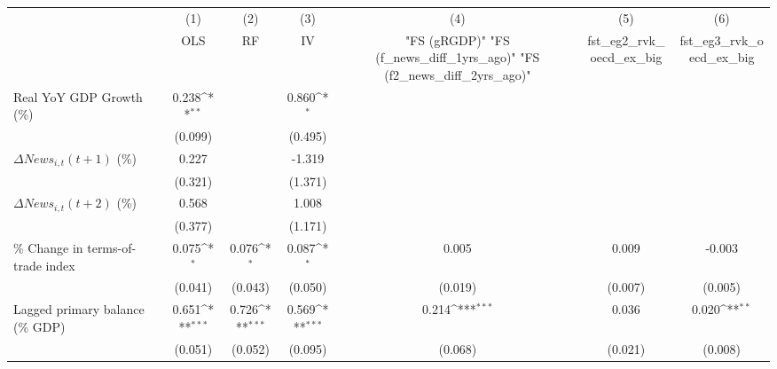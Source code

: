 {
\def\sym#1{\ifmmode^{#1}\else\(^{#1}\)\fi}
\begin{tabular}{l*{6}{c}}
\toprule
                    &\multicolumn{1}{c}{(1)}&\multicolumn{1}{c}{(2)}&\multicolumn{1}{c}{(3)}&\multicolumn{1}{c}{(4)}&\multicolumn{1}{c}{(5)}&\multicolumn{1}{c}{(6)}\\
                    &\multicolumn{1}{c}{OLS}&\multicolumn{1}{c}{RF}&\multicolumn{1}{c}{IV}&\multicolumn{1}{c}{ "FS (gRGDP)"  "FS (f_news_diff_1yrs_ago)"  "FS (f2_news_diff_2yrs_ago)" }&\multicolumn{1}{c}{fst_eg2_rvk_oecd_ex_big}&\multicolumn{1}{c}{fst_eg3_rvk_oecd_ex_big}\\
\midrule
Real YoY GDP Growth (\%)&       0.238\sym{**} &                     &       0.860\sym{*}  &                     &                     &                     \\
                    &     (0.099)         &                     &     (0.495)         &                     &                     &                     \\
\addlinespace
$ \Delta News_{i,t}(t+1)$ (\%)&       0.227         &                     &      -1.319         &                     &                     &                     \\
                    &     (0.321)         &                     &     (1.371)         &                     &                     &                     \\
\addlinespace
$ \Delta News_{i,t}(t+2)$ (\%)&       0.568         &                     &       1.008         &                     &                     &                     \\
                    &     (0.377)         &                     &     (1.171)         &                     &                     &                     \\
\addlinespace
\% Change in terms-of-trade index&       0.075\sym{*}  &       0.076\sym{*}  &       0.087\sym{*}  &       0.005         &       0.009         &      -0.003         \\
                    &     (0.041)         &     (0.043)         &     (0.050)         &     (0.019)         &     (0.007)         &     (0.005)         \\
\addlinespace
Lagged primary balance (\% GDP)&       0.651\sym{***}&       0.726\sym{***}&       0.569\sym{***}&       0.214\sym{***}&       0.036         &       0.020\sym{**} \\
                    &     (0.051)         &     (0.052)         &     (0.095)         &     (0.068)         &     (0.021)         &     (0.008)         \\

\end{tabular}}
